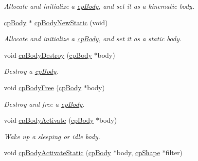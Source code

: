 \begin{DoxyCompactItemize}
\begin{DoxyCompactList}\small\item\em Allocate and initialize a \hyperlink{structcp_body}{cp\+Body}, and set it as a kinematic body. \end{DoxyCompactList}\item 
\hypertarget{group__cp_body_gaef08bd4d7afd793e859f5d7b1001344c}{}\hyperlink{structcp_body}{cp\+Body} $\ast$ \hyperlink{group__cp_body_gaef08bd4d7afd793e859f5d7b1001344c}{cp\+Body\+New\+Static} (void)\label{group__cp_body_gaef08bd4d7afd793e859f5d7b1001344c}

\begin{DoxyCompactList}\small\item\em Allocate and initialize a \hyperlink{structcp_body}{cp\+Body}, and set it as a static body. \end{DoxyCompactList}\item 
\hypertarget{group__cp_body_ga7691fd53f979e5f1e23fbdbc7b0ab31a}{}void \hyperlink{group__cp_body_ga7691fd53f979e5f1e23fbdbc7b0ab31a}{cp\+Body\+Destroy} (\hyperlink{structcp_body}{cp\+Body} $\ast$body)\label{group__cp_body_ga7691fd53f979e5f1e23fbdbc7b0ab31a}

\begin{DoxyCompactList}\small\item\em Destroy a \hyperlink{structcp_body}{cp\+Body}. \end{DoxyCompactList}\item 
\hypertarget{group__cp_body_gab122c9fc675a7f2cb6a644a1532c60f7}{}void \hyperlink{group__cp_body_gab122c9fc675a7f2cb6a644a1532c60f7}{cp\+Body\+Free} (\hyperlink{structcp_body}{cp\+Body} $\ast$body)\label{group__cp_body_gab122c9fc675a7f2cb6a644a1532c60f7}

\begin{DoxyCompactList}\small\item\em Destroy and free a \hyperlink{structcp_body}{cp\+Body}. \end{DoxyCompactList}\item 
\hypertarget{group__cp_body_ga9f6b2af6329a2b5c32712576719d357a}{}void \hyperlink{group__cp_body_ga9f6b2af6329a2b5c32712576719d357a}{cp\+Body\+Activate} (\hyperlink{structcp_body}{cp\+Body} $\ast$body)\label{group__cp_body_ga9f6b2af6329a2b5c32712576719d357a}

\begin{DoxyCompactList}\small\item\em Wake up a sleeping or idle body. \end{DoxyCompactList}\item 
\hypertarget{group__cp_body_gaad8cfcc01f2a5a4ab4e98c49e2442063}{}void \hyperlink{group__cp_body_gaad8cfcc01f2a5a4ab4e98c49e2442063}{cp\+Body\+Activate\+Static} (\hyperlink{structcp_body}{cp\+Body} $\ast$body, \hyperlink{structcp_shape}{cp\+Shape} $\ast$filter)\label{group__cp_body_gaad8cfcc01f2a5a4ab4e98c49e2442063}


\end{DoxyCompactItemize}
